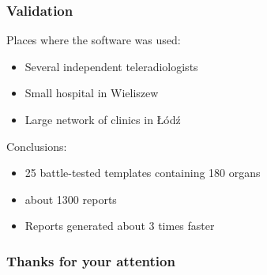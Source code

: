 \documentclass{beamer}
\begin{document}
\begin{frame}
\frametitle{Validation}
Places where the software was used:
\begin{itemize}
	\item Several independent teleradiologists
	\item Small hospital in Wieliszew
	\item Large network of clinics in Łódź
\end{itemize}

Conclusions:
\begin{itemize}
	\item 25 battle-tested templates containing 180 organs
	\item about 1300 reports 
	\item Reports generated about 3 times faster
\end{itemize}
\end{frame}

\begin{frame}
\frametitle{Thanks for your attention}
\end{frame}
\end{document}
